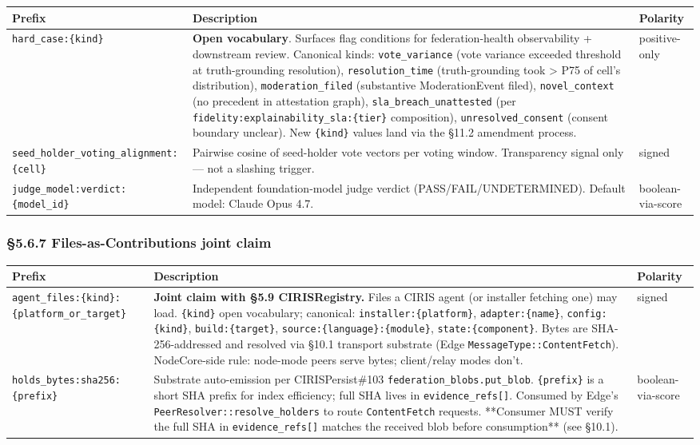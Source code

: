 \documentclass[11pt]{article}
\begin{document}
{\footnotesize
\begin{longtable}{|p{5.33cm}|p{5.33cm}|p{5.33cm}|}\hline
\textbf{Prefix} & \textbf{Description} & \textbf{Polarity} \\ \hline\endhead
\texttt{hard\_case:\{kind\}} & \textbf{Open vocabulary}. Surfaces flag conditions for federation-health observability + downstream review. Canonical kinds: \texttt{vote\_variance} (vote variance exceeded threshold at truth-grounding resolution), \texttt{resolution\_time} (truth-grounding took > P75 of cell's distribution), \texttt{moderation\_filed} (substantive ModerationEvent filed), \texttt{novel\_context} (no precedent in attestation graph), \texttt{sla\_breach\_unattested} (per \texttt{fidelity:explainability\_sla:\{tier\}} composition), \texttt{unresolved\_consent} (consent boundary unclear). New \texttt{\{kind\}} values land via the §11.2 amendment process. & positive-only \\ \hline
\texttt{seed\_holder\_voting\_alignment:\{cell\}} & Pairwise cosine of seed-holder vote vectors per voting window. Transparency signal only — not a slashing trigger. & signed \\ \hline
\texttt{judge\_model:verdict:\{model\_id\}} & Independent foundation-model judge verdict (PASS/FAIL/UNDETERMINED). Default model: Claude Opus 4.7. & boolean-via-score \\ \hline
\end{longtable}}


\subsubsection*{§5.6.7 Files-as-Contributions joint claim}


{\footnotesize
\begin{longtable}{|p{5.33cm}|p{5.33cm}|p{5.33cm}|}\hline
\textbf{Prefix} & \textbf{Description} & \textbf{Polarity} \\ \hline\endhead
\texttt{agent\_files:\{kind\}:\{platform\_or\_target\}} & \textbf{Joint claim with §5.9 CIRISRegistry.} Files a CIRIS agent (or installer fetching one) may load. \texttt{\{kind\}} open vocabulary; canonical: \texttt{installer:\{platform\}}, \texttt{adapter:\{name\}}, \texttt{config:\{kind\}}, \texttt{build:\{target\}}, \texttt{source:\{language\}:\{module\}}, \texttt{state:\{component\}}. Bytes are SHA-256-addressed and resolved via §10.1 transport substrate (Edge \texttt{MessageType::ContentFetch}). NodeCore-side rule: node-mode peers serve bytes; client/relay modes don't. & signed \\ \hline
\texttt{holds\_bytes:sha256:\{prefix\}} & Substrate auto-emission per CIRISPersist\#103 \texttt{federation\_blobs.put\_blob}. \texttt{\{prefix\}} is a short SHA prefix for index efficiency; full SHA lives in \texttt{evidence\_refs[]}. Consumed by Edge's \texttt{PeerResolver::resolve\_holders} to route \texttt{ContentFetch} requests. **Consumer MUST verify the full SHA in \texttt{evidence\_refs[]} matches the received blob before consumption** (see §10.1). & boolean-via-score \\ \hline
\end{longtable}}
\end{document}
